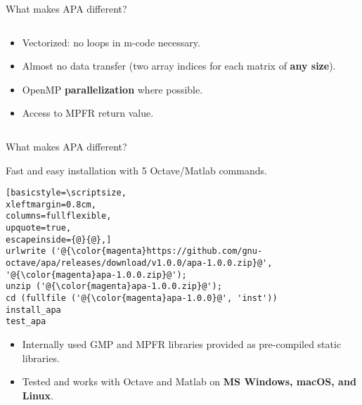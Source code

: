 \begin{frame}[fragile]{What makes APA different?}
\begin{columns}
\begin{column}{0.35\linewidth}
\begin{itemize}
\item
Vectorized: no loops in m-code necessary.

\item
Almost no data transfer
(two array indices for each matrix of \textbf{any size}).

\item
OpenMP \textbf{parallelization} where possible.

\item
Access to MPFR return value.
\end{itemize}
\end{column}
\end{columns}

\end{frame}


\begin{frame}[fragile]{What makes APA different?}

\begin{block}{Fast and easy installation with 5 Octave/Matlab commands.}
\begin{lstlisting}[basicstyle=\scriptsize,
xleftmargin=0.8cm,
columns=fullflexible,
upquote=true,
escapeinside={@}{@},]
urlwrite ('@{\color{magenta}https://github.com/gnu-octave/apa/releases/download/v1.0.0/apa-1.0.0.zip}@', '@{\color{magenta}apa-1.0.0.zip}@');
unzip ('@{\color{magenta}apa-1.0.0.zip}@');
cd (fullfile ('@{\color{magenta}apa-1.0.0}@', 'inst'))
install_apa
test_apa
\end{lstlisting}

\begin{itemize}
\item
Internally used GMP and MPFR libraries provided as pre-compiled static libraries.

\item
Tested and works with Octave and Matlab on \textbf{MS Windows, macOS, and Linux}.
\end{itemize}
\end{block}

\end{frame}


